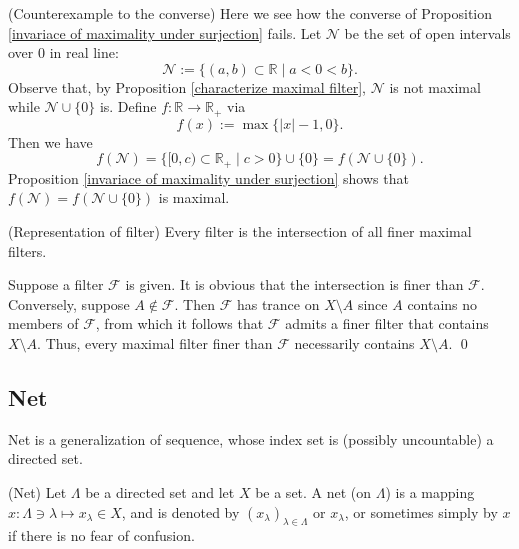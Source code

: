 \documentclass{article}
\begin{document}
\begin{ex} (Counterexample to the converse)
    Here we see how the converse of Proposition \ref{invariace of maximality under surjection} fails. Let \( \mathscr{N} \) be the set of open intervals over 0 in real line:
    \[
        \mathscr{N} := \{(a,b) \subset \mathbb{R} \mid a<0<b\}.
    \]
    Observe that, by Proposition \ref{characterize maximal filter}, \( \mathscr{N} \) is not maximal while \( \mathscr{N}\cup \{0\} \) is.
    Define \( f:\mathbb{R}\to \mathbb{R}_+ \) via
    \[
        f(x):=\max \{|x|-1,0\}.
    \]
    Then we have
    \[
        f(\mathscr{N}) =\{[0,c) \subset \mathbb{R}_+ \mid c>0\} \cup \{0\} = f(\mathscr{N}\cup \{0\}).
    \]
    Proposition \ref{invariace of maximality under surjection} shows that \( f(\mathscr{N}) = f(\mathscr{N}\cup \{0\}) \) is maximal.
\end{ex}

\begin{prp} (Representation of filter)
    Every filter is the intersection of all finer maximal filters.
\end{prp}
\begin{prf}
    Suppose a filter \( \mathscr{F} \) is given. It is obvious that the intersection is finer than \( \mathscr{F} \). Conversely, suppose \( A \notin \mathscr{F}\). Then \( \mathscr{F} \) has trance on \( X \setminus A \) since \( A \) contains no members of \( \mathscr{F} \), from which it follows that \( \mathscr{F} \) admits a finer filter that contains \( X \setminus A \). Thus, every maximal filter finer than \( \mathscr{F} \) necessarily contains \( X \setminus A \).
    \qed\end{prf}


\subsection{Net} \label{net}
Net is a generalization of sequence, whose index set is (possibly uncountable) a directed set.

\begin{dfn} (Net)
    Let \( \Lambda \) be a directed set and let \( X \) be a set.
    A net (on \( \Lambda \)) is a mapping \( x: \Lambda \ni \lambda \mapsto x_{\lambda}\in X \), and is denoted by \( (x_{\lambda})_{\lambda \in \Lambda} \) or \( x_{\lambda} \), or sometimes simply by \( x \) if there is no fear of confusion.
\end{dfn}
\end{document}
